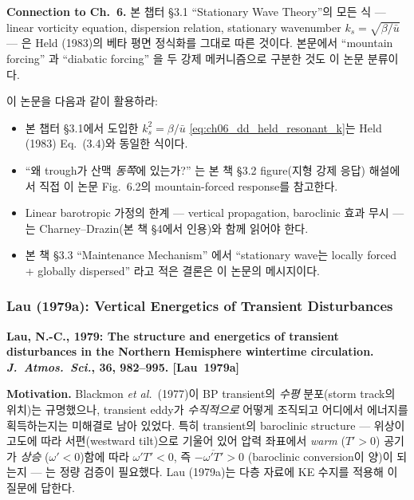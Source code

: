 \medskip
\noindent\textbf{Connection to Ch.~6.}\quad
본 챕터 \S3.1 ``Stationary Wave Theory''의 모든 식 ---
linear vorticity equation, dispersion relation, stationary wavenumber $k_s = \sqrt{\beta/\bar u}$ ---
은 Held (1983)의 베타 평면 정식화를 그대로 따른 것이다.  본문에서
``mountain forcing'' 과 ``diabatic forcing'' 을 두 강제 메커니즘으로 구분한 것도 이 논문 분류이다.

\begin{hisublock}
이 논문을 다음과 같이 활용하라:
\begin{itemize}
  \item 본 챕터 \S3.1에서 도입한 $k_s^2 = \beta/\bar u$
        \eqref{eq:ch06_dd_held_resonant_k}는 Held (1983) Eq.~(3.4)와 동일한 식이다.
  \item ``왜 trough가 산맥 \emph{동쪽}에 있는가?'' 는 본 책 \S3.2 figure(지형 강제 응답)
        해설에서 직접 이 논문 Fig.~6.2의 mountain-forced response를 참고한다.
  \item Linear barotropic 가정의 한계 --- vertical propagation, baroclinic 효과 무시 ---
        는 Charney--Drazin(본 책 \S4에서 인용)와 함께 읽어야 한다.
  \item 본 책 \S3.3 ``Maintenance Mechanism'' 에서 ``stationary wave는 locally
        forced + globally dispersed'' 라고 적은 결론은 이 논문의 메시지이다.
\end{itemize}
\end{hisublock}


\subsubsection{Lau (1979a): Vertical Energetics of Transient Disturbances}

\textbf{Lau, N.-C., 1979: The structure and energetics of transient disturbances in the Northern Hemisphere wintertime circulation.
\emph{J.\ Atmos.\ Sci.}, \textbf{36}, 982--995.  [Lau~1979a]}

\medskip
\noindent\textbf{Motivation.}\quad
Blackmon \emph{et al.}\ (1977)이 BP transient의 \emph{수평} 분포(storm track의 위치)는
규명했으나, transient eddy가 \emph{수직적으로} 어떻게 조직되고 어디에서 에너지를
획득하는지는 미해결로 남아 있었다.  특히 transient의 baroclinic structure --- 위상이 고도에
따라 서편(westward tilt)으로 기울어 있어 압력 좌표에서 \emph{warm} ($T'>0$) 공기가
\emph{상승} ($\omega'<0$)함에 따라 $\omega'T'<0$, 즉 $-\overline{\omega'T'}>0$
(baroclinic conversion이 양)이 되는지 --- 는 정량 검증이 필요했다.
Lau (1979a)는 다층 자료에 KE 수지를 적용해 이 질문에 답한다.

